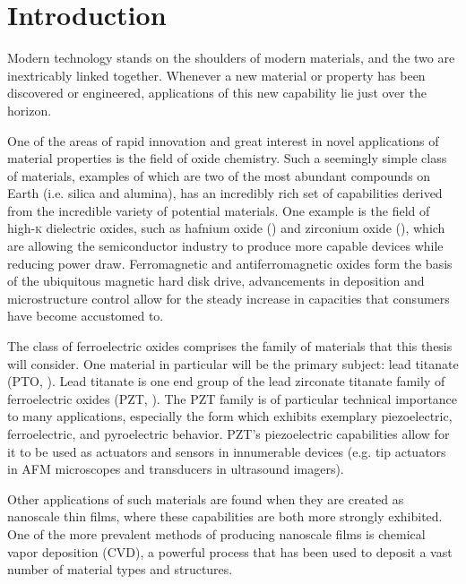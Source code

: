\chapter{Introduction}
\label{ch:Intro}
\thispagestyle{empty}



Modern technology stands on the shoulders of modern materials, and the two are inextricably linked together. Whenever a new material or property has been discovered or engineered, applications of this new capability lie just over the horizon. 

One of the areas of rapid innovation and great interest in novel applications of material properties is the field of oxide chemistry. Such a seemingly simple class of materials, examples of which are two of the most abundant compounds on Earth (i.e. silica and alumina), has an incredibly rich set of capabilities derived from the incredible variety of potential materials. One example is the field of high-\textsc{k} dielectric oxides, such as hafnium oxide () and zirconium oxide (),\cite{chen_atomic_2007,fischer_batch_2008} which are allowing the semiconductor industry to produce more capable devices while reducing power draw. Ferromagnetic and antiferromagnetic oxides form the basis of the ubiquitous magnetic hard disk drive, advancements in deposition and microstructure control allow for the steady increase in capacities that consumers have become accustomed to.\cite{scheffe_atomic_2009}

The class of ferroelectric oxides comprises the family of materials that this thesis will consider. One material in particular will be the primary subject: lead titanate (PTO, \PTO{}).\cite{harjuoja_2006,lee_effects_2009} Lead titanate is one end group of the lead zirconate titanate family of ferroelectric oxides (PZT, ).\cite{Muralt_2000} The PZT family is of particular technical importance to many applications, especially the  form which exhibits exemplary piezoelectric, ferroelectric, and pyroelectric behavior. PZT's piezoelectric capabilities allow for it to be used as actuators and sensors in innumerable devices (e.g. tip actuators in AFM microscopes and transducers in ultrasound imagers). 

Other applications of such materials are found when they are created as nanoscale thin films, where these capabilities are both more strongly exhibited. One of the more prevalent methods of producing nanoscale films is chemical vapor deposition (CVD), a powerful process that has been used to deposit a vast number of material types and structures.\cite{Matsumara_1998}

